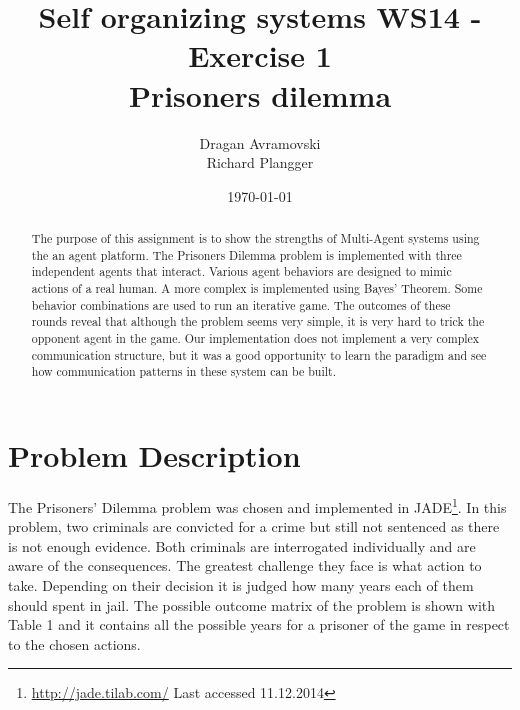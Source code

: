 \documentclass{acm_proc_article-sp}
\begin{document}
\title{Self organizing systems WS14 - Exercise 1\\
       Prisoners dilemma}%

\author{
\alignauthor
Dragan Avramovski\\
\alignauthor
Richard Plangger\\
}

\date{\today}

\maketitle

\begin{abstract}
 The purpose of this assignment is to show the strengths of Multi-Agent systems using the an agent platform. The Prisoners Dilemma problem is implemented with three independent agents that interact. Various agent behaviors are designed to mimic actions of a real human. A more complex is implemented using Bayes' Theorem. Some behavior combinations 
 are used to run an iterative game. The outcomes of these rounds reveal that although the problem seems very simple, it is very hard to trick the opponent agent in the game. Our
 implementation does not implement a very complex communication structure, but it
 was a good opportunity to learn the paradigm and see how communication patterns in
 these system can be built.
\end{abstract}



\section{Problem Description}
\label{sec:problem-desc}

The Prisoners' Dilemma problem was chosen and implemented in JADE\footnote{\url{http://jade.tilab.com/} Last accessed 11.12.2014}. In this problem, two criminals are convicted for a crime but still not sentenced as there is not enough evidence. Both criminals are interrogated individually and are aware of the consequences. The greatest challenge they face is what action to take. Depending on their decision it is judged how many
years each of them should spent in jail. 
The possible outcome matrix of the problem is shown with Table 1 and it contains all the possible years for a prisoner of the game in respect to the chosen actions.
\end{document}
